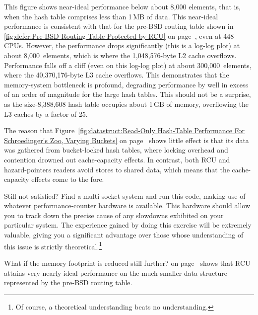 {	This figure shows near-ideal performance below about 8,000
	elements, that is, when the hash table comprises less than
	1\,MB of data.
	This near-ideal performance is consistent with that for the
	pre-BSD routing table shown in
	\cref{fig:defer:Pre-BSD Routing Table Protected by RCU}
	on page~\pageref{fig:defer:Pre-BSD Routing Table Protected by RCU},
	even at 448 CPUs.
	However, the performance drops significantly (this is a log-log
	plot) at about 8,000~elements, which is where the 1,048,576-byte
	L2 cache overflows.
	Performance falls off a cliff (even on this log-log plot) at about
	300,000~elements, where the 40,370,176-byte L3 cache overflows.
	This demonstrates that the memory-system bottleneck is profound,
	degrading performance by well in excess of an order of magnitude
	for the large hash tables.
	This should not be a surprise, as the size-8,388,608 hash table
	occupies about 1\,GB of memory, overflowing the L3 caches by
	a factor of 25.

	The reason that
	Figure~\ref{fig:datastruct:Read-Only Hash-Table Performance For Schroedinger's Zoo, Varying Buckets}
	on page~\pageref{fig:datastruct:Read-Only Hash-Table Performance For Schroedinger's Zoo, Varying Buckets}
	shows little effect is that its data was gathered from
	bucket-locked hash tables, where locking overhead and contention
	drowned out cache-capacity effects.
	In contrast, both RCU and hazard-pointers readers avoid stores
	to shared data, which means that the cache-capacity effects come
	to the fore.

	Still not satisfied?
	Find a multi-socket system and run this code, making use of
	whatever performance-counter hardware is available.
	This hardware should allow you to track down the precise cause
	of any slowdowns exhibited on your particular system.
	The experience gained by doing this exercise will be extremely
	valuable, giving you a significant advantage over those whose
	understanding of this issue is strictly theoretical.\footnote{
		Of course, a theoretical understanding beats no
		understanding.}
}\QuickQuizEnd

What if the memory footprint is reduced still further?
on page~\pageref{fig:defer:Pre-BSD Routing Table Protected by RCU QSBR With Non-Initial rcu-head}
shows that RCU attains very nearly ideal performance on the much smaller
data structure represented by the pre-BSD routing table.

